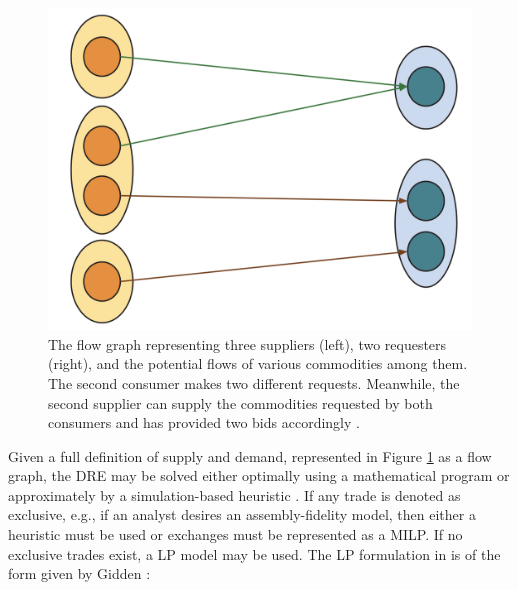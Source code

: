 \begin{figure}[htbp]
\begin{center}
\includegraphics[width=\columnwidth]{./images/bid_req}
\end{center}
\caption{The flow graph representing three suppliers (left), two requesters (right), 
and the potential flows of various commodities among them. 
The second consumer makes two different requests.
Meanwhile, the second supplier can supply the commodities 
requested by both consumers and has provided two bids accordingly 
\cite{gidden_agent-based_2015}.}
\label{fig:bid_req}
\end{figure}

Given a full definition of supply and demand, represented in Figure 
\ref{fig:bid_req} as a flow graph, the \gls{DRE} may be solved either
optimally using a mathematical program or approximately by a simulation-based
heuristic \cite{gidden_agent-based_2015}. If any trade is denoted as exclusive, e.g., if an
analyst desires an assembly-fidelity model, then either a heuristic must be used
or exchanges must be represented as a \gls{MILP}. If no exclusive trades exist,
a \gls{LP} model may be used. The \gls{LP} formulation in \Cyclus is of the 
form given by Gidden \cite{gidden_agent-based_2015}:

